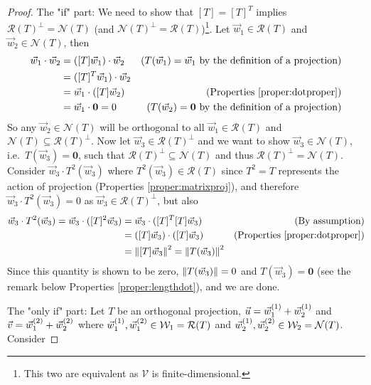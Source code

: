 \begin{proof}
The "if" part: We need to show that $[T] = [T]^T$ implies $\mathcal{R}(T)^\perp = \mathcal{N}(T)$ (and $\mathcal{N}(T)^\perp = \mathcal{R}(T)$)\footnote{This two are equivalent as $\mathcal{V}$ is finite-dimensional.}. Let $\vec{w}_1 \in \mathcal{R}(T)$ and $\vec{w}_2 \in \mathcal{N}(T)$, then 
\begin{align*}
\vec{w}_1 \cdot \vec{w}_2 &= ([T]\vec{w}_1) \cdot \vec{w}_2 & \text{($T(\vec{w}_1) = \vec{w}_1$ by the definition of a projection)} \\
&= ([T]^T\vec{w}_1) \cdot \vec{w}_2 \\
&= \vec{w}_1 \cdot ([T]\vec{w}_2) & \text{(Properties \ref{proper:dotproper})} \\
&= \vec{w}_1 \cdot \textbf{0} = 0 & \text{($T(\vec{w}_2) = \textbf{0}$ by the definition of a projection)}
\end{align*}
So any $\vec{w}_2 \in \mathcal{N}(T)$ will be orthogonal to all $\vec{w}_1 \in \mathcal{R}(T)$ and $\mathcal{N}(T) \subseteq \mathcal{R}(T)^\perp$. Now let $\vec{w}_3 \in \mathcal{R}(T)^\perp$ and we want to show $\vec{w}_3 \in \mathcal{N}(T)$, i.e.\ $T(\vec{w}_3) = \textbf{0}$, such that $\mathcal{R}(T)^\perp \subseteq \mathcal{N}(T)$ and thus $\mathcal{R}(T)^\perp = \mathcal{N}(T)$. Consider $\vec{w}_3 \cdot T^2(\vec{w}_3)$ where $T^2(\vec{w}_3) \in \mathcal{R}(T)$ since $T^2 = T$ represents the action of projection (Properties \ref{proper:matrixproj}), and therefore $\vec{w}_3 \cdot T^2(\vec{w}_3) = 0$ as $\vec{w}_3 \in \mathcal{R}(T)^\perp$, but also
\begin{align*}
\vec{w}_3 \cdot T^2(\vec{w}_3) = \vec{w}_3 \cdot ([T]^2\vec{w}_3) &= \vec{w}_3 \cdot ([T]^T[T]\vec{w}_3) & \text{(By assumption)} \\
&= ([T]\vec{w}_3) \cdot ([T]\vec{w}_3) & \text{(Properties \ref{proper:dotproper})} \\
&= \norm{[T]\vec{w}_3}^2 = \norm{T(\vec{w}_3)}^2 
\end{align*}
Since this quantity is shown to be zero, $\norm{T(\vec{w}_3)} = 0$ and $T(\vec{w}_3) = \textbf{0}$ (see the remark below Properties \ref{proper:lengthdot}), and we are done.\par
The "only if" part: Let $T$ be an orthogonal projection, $\vec{u} = \smash{\vec{w}_1^{(1)}} + \smash{\vec{w}_2^{(1)}}$ and $\vec{v} = \smash{\vec{w}_1^{(2)}} + \smash{\vec{w}_2^{(2)}}$ where $\smash{\vec{w}_1^{(1)}}, \smash{\vec{w}_1^{(2)}} \in \mathcal{W}_1 = \mathcal{R}(T)$ and $\smash{\vec{w}_2^{(1)}}, \smash{\vec{w}_2^{(2)}} \in \mathcal{W}_2 = \mathcal{N}(T)$. Consider 

\end{proof}
